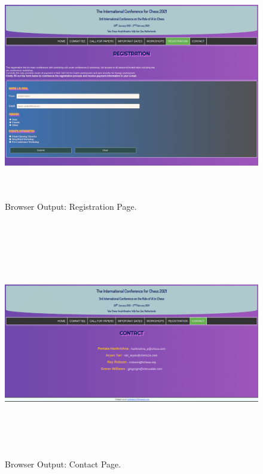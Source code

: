 \documentclass[12pt, a4]{article}
\begin{document}
\newpage
\subsection*{}
\begin{figure}[h]
\centering
\caption{Browser Output: Registration Page.}
\includegraphics[height=10cm, width=18cm, keepaspectratio]{Output/Reg.png}
\end{figure}


\newpage
\subsection*{}
\begin{figure}[h]
\centering
\caption{Browser Output: Contact Page.}
\includegraphics[height=10cm, width=18cm, keepaspectratio]{Output/Contact.png}
\end{figure}
\end{document}
